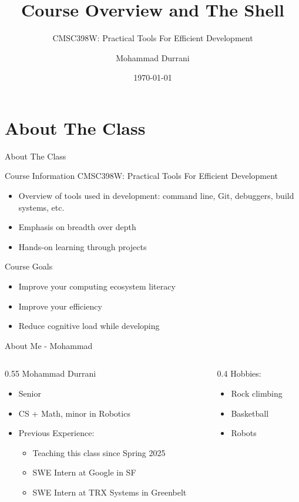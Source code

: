 \documentclass[presentation,aspectratio=1610]{beamer}
\author{Mohammad Durrani}
\date{\today}
\title{Course Overview and The Shell}
\subtitle{CMSC398W: Practical Tools For Efficient Development}
\begin{document}
\maketitle
\section*{About The Class}
\label{sec:org776c389}

\begin{frame}[label={sec:orgaccb531}]{About The Class}
\begin{block}{Course Information}
\alert{CMSC398W: Practical Tools For Efficient Development}

\begin{itemize}
\item Overview of tools used in development: command line, Git, debuggers, build systems, etc.
\item Emphasis on breadth over depth
\item Hands-on learning through projects
\end{itemize}
\end{block}
\begin{exampleblock}{Course Goals}\label{sec:org9b9bfe7}
\begin{itemize}
\item Improve your computing ecosystem literacy
\item Improve your efficiency
\item Reduce cognitive load while developing
\end{itemize}
\end{exampleblock}
\end{frame}
\begin{frame}[label={sec:orgf86fadb}]{About Me - Mohammad}
\begin{columns}
\begin{column}{0.55\columnwidth}
\alert{Mohammad Durrani}

\begin{itemize}
\item Senior
\item CS + Math, minor in Robotics
\item \alert{Previous Experience:}
\begin{itemize}
\item Teaching this class since Spring 2025
\item SWE Intern at Google in SF
\item SWE Intern at TRX Systems in Greenbelt
\end{itemize}
\end{itemize}
\end{column}
\begin{column}{0.4\columnwidth}
\alert{Hobbies:}

\begin{itemize}
\item Rock climbing
\item Basketball
\item Robots
\end{itemize}
\end{column}
\end{columns}
\end{frame}
\end{document}
